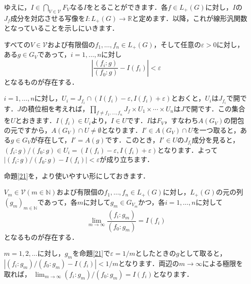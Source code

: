ゆえに，$I \in \bigcap_{V \in \mathscr{V}}F_V$なる$I$をとることができます．各$f \in L_{+}(G)$に対し，$I$の$J_f$成分を対応させる写像を$I : L_{+}(G) \to \mathbb{R}$と定めます．以降，これが線形汎関数となっていることを示しにいきます．
\begin{yprop}\label{21}
すべての$V \in \mathscr{V}$および有限個の$f_1, \ldots , f_n \in L_{+}(G)$，そして任意の$\varepsilon > 0$に対し，ある$g \in G_V$であって，$i=1, \ldots , n$に対し
\[
\left\lvert \frac{(f_i : g )}{( f_0 : g )} -I(f_i) \right\rvert < \varepsilon
\]
となるものが存在する．
\end{yprop}
\begin{Proof}
$i=1, \ldots , n$に対し，$U_i=J_{f_i} \cap ( I(f_i)- \varepsilon, I(f_i)+\varepsilon )$とおくと，$U_i$は$J_{f_i}$で開です．$J$の積位相を考えれば，$\prod_{f \neq f_1, \ldots , f_n}J_f \times U_1 \times \cdots \times U_n$は$J$で開です．この集合を$U$とおきます．$I(f_i) \in U_i$より，$I \in U$です．$I$は$F_V$，すなわち$A(G_V)$の閉包の元ですから，$A(G_V) \cap U \neq \emptyset$となります．$I' \in A(G_V) \cap U$を一つ取ると，ある$g \in G_V$が存在して，$I'=A(g)$です．このとき，$I' \in U$の$J_{f_i}$成分を見ると，$(f_i : g ) / ( f_0 : g ) \in U_i = ( I(f_i)- \varepsilon, I(f_i)+\varepsilon )$となります．よって$|(f_i : g ) / ( f_0 : g ) -I(f_i) | < \varepsilon$が成り立ちます．
\end{Proof}
命題\ref{21}を，より使いやすい形にしておきます．

\begin{ycor}\label{22}
$V_m \in \mathscr{V}(m \in \mathbb{N})$および有限個の$f_1, \ldots , f_n \in L_{+}(G)$に対し，$L_{+}(G)$の元の列$(g_m)_{m \in \mathbb{N}}$であって，各$m$に対して$g_m \in G_{V_m}$かつ，各$i=1, \ldots , n$に対して 
\[
\lim_{m \to \infty} \frac{(f_i : g_m )}{( f_0 : g_m )} =I(f_i)
\]
となるものが存在する．
\end{ycor}
\begin{Proof}
$m=1,2, \ldots$に対し，$g_m$を命題\ref{21}で$\varepsilon = 1/m$としたときの$g$として取ると，$|(f_i : g_m ) / ( f_0 : g_m ) -I(f_i) | < 1/m$となります．両辺の$m \to \infty$による極限を取れば， $\lim_{m \to \infty} (f_i : g_m ) / ( f_0 : g_m ) =I(f_i)$となります．　
\end{Proof}

